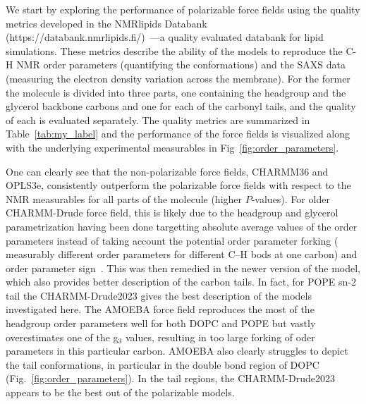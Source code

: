 \documentclass[journal=jacsat,manuscript=article,layout=singlecolumn]{achemso}
\begin{document}
We start by exploring the performance of polarizable force fields using the quality metrics developed in the NMRlipids Databank (https://databank.nmrlipids.fi/)~\cite{Databank}---a quality evaluated databank for lipid simulations. These metrics describe the ability of the models to reproduce the C-H NMR order parameters (quantifying the conformations) and the SAXS data (measuring the electron density variation across the membrane). For the former the molecule is divided into three parts, one containing the headgroup and the glycerol backbone carbons and one for each of the carbonyl tails, and the quality of each is evaluated separately. The quality metrics are summarized in Table~\ref{tab:my_label} and the performance of the force fields is visualized along with the underlying experimental measurables in Fig~\ref{fig:order_parameters}. 

One can clearly see that the non-polarizable force fields, CHARMM36 and OPLS3e, consistently outperform the polarizable force fields with respect to the NMR measurables for all parts of the molecule (higher $P$-values). For older CHARMM-Drude force field, this is likely due to the headgroup and glycerol parametrization having been done targetting absolute average values of the order parameters instead of taking account the potential order parameter forking ( measurably different order parameters for different C--H bods at one carbon) and order parameter sign~\cite{Antila2022}. This was then remedied in the newer version of the model, which also provides better description of the carbon tails. In fact, for POPE sn-2 tail the CHARMM-Drude2023 gives the best description of the models investigated here.  The AMOEBA force field reproduces the most of the headgroup order parameters well for both DOPC and POPE but vastly overestimates one of the g$_3$ values, resulting in too large forking of oder parameters in this particular carbon. AMOEBA also clearly struggles to depict the tail conformations, in particular in the double bond region of DOPC (Fig.~\ref{fig:order_parameters}). In the tail regions, the CHARMM-Drude2023 appears to be the best out of the polarizable models. 
\end{document}
